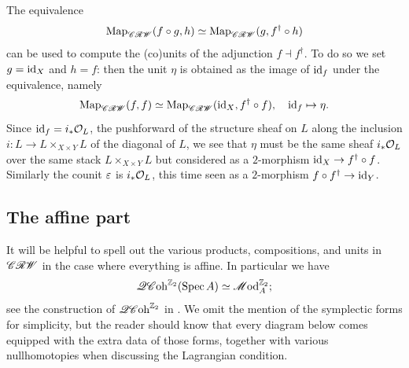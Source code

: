 The equivalence
\begin{equation*}
	\mathrm{Map}_{\mathscr{CRW}}(f \circ g, h) \simeq \mathrm{Map}_{\mathscr{CRW}}(g, f^\dagger \circ h)
\end{equation*}
can be used to compute the (co)units of the adjunction $f \dashv f^\dagger$. To do so we set $g = \mathrm{id}_X$ and $h = f$: then the unit $\eta$ is obtained as the image of $\mathrm{id}_f$ under the equivalence, namely
\begin{equation*}
	\mathrm{Map}_{\mathscr{CRW}}(f, f) \simeq \mathrm{Map}_{\mathscr{CRW}}(\mathrm{id}_X, f^\dagger \circ f), \quad \mathrm{id}_f \mapsto \eta.
\end{equation*}
Since $\mathrm{id}_f = i_\ast \mathcal{O}_{L}$, the pushforward of the structure sheaf on $L$ along the inclusion $i : L \to L \times_{X \times Y} L$ of the diagonal of $L$, we see that $\eta$ must be the same sheaf $i_\ast \mathcal{O}_{L}$ over the same stack $L \times_{X \times Y} L$ but considered as a $2$-morphism $\mathrm{id}_X \to f^\dagger \circ f$. Similarly the counit $\varepsilon$ is $i_\ast \mathcal{O}_L$, this time seen as a $2$-morphism $f \circ f^\dagger \to \mathrm{id}_Y$.

\subsection{The affine part} \label{sec:affine-part}

It will be helpful to spell out the various products, compositions, and units in $\mathscr{CRW}$ in the case where everything is affine. In particular we have
\begin{equation*}
	\mathscr{QC}\mathrm{oh}^{\mathbb{Z}_2}(\operatorname{Spec} A) \simeq \mathscr{M}\mathrm{od}_A^{\mathbb{Z}_2};
\end{equation*}
see the construction of $\mathscr{QC}\mathrm{oh}^{\mathbb{Z}_2}$ in \cite[Section 3.1.3]{Riva2024}. We omit the mention of the symplectic forms for simplicity, but the reader should know that every diagram below comes equipped with the extra data of those forms, together with various nullhomotopies when discussing the Lagrangian condition.

